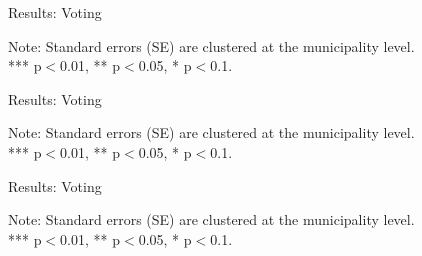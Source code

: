 \documentclass[aspectratio=169]{beamer}
\begin{document}
\begin{frame}[label=turnout]{Results: Voting}

\begin{center}
\begin{table}[h!]
\footnotesize
    \caption{Impact of refugee camp exposure on turnout}
    \vspace{-1em}
     \resizebox{0.4\textwidth}{!}{}
    \begin{minipage}{\textwidth}
    \tiny
    \centering
    \item Note: Standard errors (SE) are clustered at the municipality level. \\ *** p$<$0.01, ** p$<$0.05, * p$<$0.1.
    \end{minipage}
\end{table}
\end{center}

\end{frame}

\begin{frame}[label=spatial]{Results: Voting}

\begin{center}
\begin{table}[h!]
\footnotesize
    \caption{Impact of refugee camp exposure on the socialist vote share}
    \vspace{-1em}
     \resizebox{0.4\textwidth}{!}{}
    \begin{minipage}{\textwidth}
    \tiny
    \centering
    \item Note: Standard errors (SE) are clustered at the municipality level. \\ *** p$<$0.01, ** p$<$0.05, * p$<$0.1.
    \end{minipage}
\end{table}
\end{center}

\hyperlink{right}{}

\end{frame}

\begin{frame}[label=left]{Results: Voting}

\begin{center}
\begin{table}[h!]
\footnotesize
    \caption{Impact of refugee camp exposure on the communist vote share}
    \vspace{-1em}
     \resizebox{0.4\textwidth}{!}{}
    \begin{minipage}{\textwidth}
    \tiny
    \centering
    \item Note: Standard errors (SE) are clustered at the municipality level. \\ *** p$<$0.01, ** p$<$0.05, * p$<$0.1.
    \end{minipage}
\end{table}
\end{center}

\end{frame}
\end{document}

